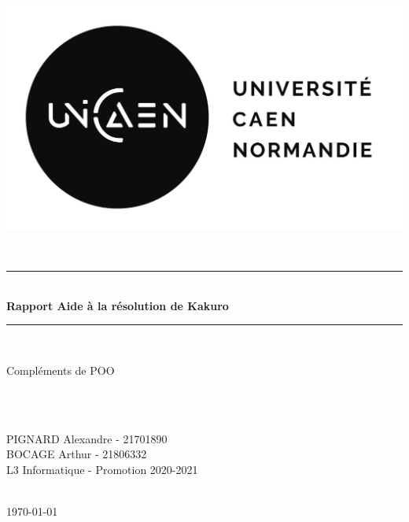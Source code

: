 \documentclass[12pt]{article}
\begin{document}
\begin{titlepage}
\newcommand{\HRule}{\rule{\linewidth}{0.5mm}}
\setlength{\topmargin}{0in}
\begin{minipage}{0.4\textwidth}
	\begin{flushleft} \large
		\hspace*{-0.5cm}
		\includegraphics[scale=0.20]{./ressources/logo-unicaen.jpg}
	\end{flushleft}
\end{minipage}
\center
\textsc{\large }\\[0.5cm]
\HRule \\[0.4cm]
{ \huge \bfseries Rapport Aide à la résolution de Kakuro}\\[0.4cm]
\HRule \\[1cm]
\begin{minipage}{\textwidth}
	\begin{flushright} \huge
		\center
		Compléments de POO
	\end{flushright}
\end{minipage}\\[1cm]
\textsc{\large }\\[1cm]
\begin{minipage}{\textwidth}
	\begin{flushright} \large
		\center
		PIGNARD Alexandre - 21701890\\BOCAGE Arthur - 21806332
		\\[1cm]
		L3 Informatique - Promotion 2020-2021
	\end{flushright}
\end{minipage}
\textsc{\large }\\[2cm]
{\large \today}\\[0.5cm]
\vfill
\end{titlepage}

\thispagestyle{empty}
\setcounter{page}{0}
\newpage
\end{document}
